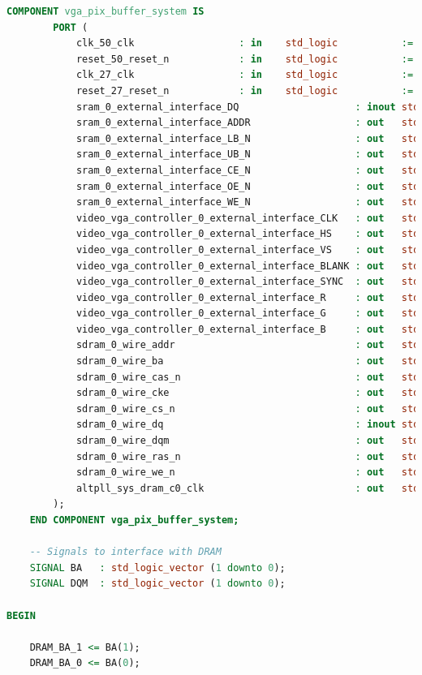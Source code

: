 \documentclass{capstonedoc}
\begin{document}
\begin{lstlisting}[language=vhdl,caption={Sample Top Level VHDL File},label={lst:toplevel},tabsize=1]
	COMPONENT vga_pix_buffer_system IS
		PORT (
			clk_50_clk                  : in    std_logic           := 'X';
			reset_50_reset_n            : in    std_logic           := 'X';
			clk_27_clk                  : in    std_logic           := 'X';
			reset_27_reset_n            : in    std_logic           := 'X';
			sram_0_external_interface_DQ                    : inout std_logic_vector(15 downto 0) := (others => 'X');
			sram_0_external_interface_ADDR                  : out   std_logic_vector(17 downto 0);
			sram_0_external_interface_LB_N                  : out   std_logic;
			sram_0_external_interface_UB_N                  : out   std_logic;
			sram_0_external_interface_CE_N                  : out   std_logic;
			sram_0_external_interface_OE_N                  : out   std_logic;
			sram_0_external_interface_WE_N                  : out   std_logic;
			video_vga_controller_0_external_interface_CLK   : out   std_logic;
			video_vga_controller_0_external_interface_HS    : out   std_logic;
			video_vga_controller_0_external_interface_VS    : out   std_logic;
			video_vga_controller_0_external_interface_BLANK : out   std_logic;
			video_vga_controller_0_external_interface_SYNC  : out   std_logic;
			video_vga_controller_0_external_interface_R     : out   std_logic_vector(9 downto 0);
			video_vga_controller_0_external_interface_G     : out   std_logic_vector(9 downto 0);
			video_vga_controller_0_external_interface_B     : out   std_logic_vector(9 downto 0);
			sdram_0_wire_addr                               : out   std_logic_vector(11 downto 0);
			sdram_0_wire_ba                                 : out   std_logic_vector(1 downto 0);
			sdram_0_wire_cas_n                              : out   std_logic;
			sdram_0_wire_cke                                : out   std_logic;
			sdram_0_wire_cs_n                               : out   std_logic;
			sdram_0_wire_dq                                 : inout std_logic_vector(15 downto 0) := (others => 'X');
			sdram_0_wire_dqm                                : out   std_logic_vector(1 downto 0);
			sdram_0_wire_ras_n                              : out   std_logic;
			sdram_0_wire_we_n                               : out   std_logic;
			altpll_sys_dram_c0_clk                          : out   std_logic
		);
	END COMPONENT vga_pix_buffer_system;

	-- Signals to interface with DRAM
	SIGNAL BA   : std_logic_vector (1 downto 0);
	SIGNAL DQM  : std_logic_vector (1 downto 0);

BEGIN

	DRAM_BA_1 <= BA(1);
	DRAM_BA_0 <= BA(0);


\end{lstlisting}
\end{document}
